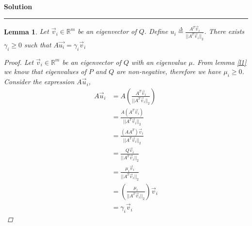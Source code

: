 \documentclass[a4paper,12pt]{article}
\newenvironment{solution}[2][]{%
    \begin{mdframed}[linecolor=blue!70!black, linewidth=2pt, roundcorner=10pt, backgroundcolor=yellow!10!white, skipabove=12pt, skipbelow=12pt]%
        \textbf{\large #2}
        \par\noindent\rule{\textwidth}{0.4pt}
}{
    \end{mdframed}
}
\newtheorem{lemma}{Lemma}
\begin{document}
\begin{solution}{Solution}
        \begin{lemma}\label{l3}
          Let $\vec{v}_{i} \in \mathbb{R}^{m}$ be an eigenvector of $Q$. Define 
          $u_{i} \stackrel{\Delta}{=} \frac{A^{T} \vec{v}_{i}}{\lvert\lvert A^{T} \vec{v}_{i} \rvert\rvert_{2}}$. There exists 
          $\gamma_{i} \geqslant 0$ such that $A\vec{u_{i}} = \gamma_{i} \vec{v}_{i}$
          \begin{proof} %
            Let $\vec{v}_{i} \in \mathbb{R}^{m}$ be an eigenvector of $Q$ with an eigenvalue $\mu$. From lemma \@\ref{l1} we know that eigenvalues of $P$ and $Q$ are non-negative, therefore we have 
            $\mu_{i} \geqslant 0$.
            Consider the expression $A\vec{u}_{i}$,
            \begin{align}
               A\vec{u}_{i} &= A \left(\frac{A^{T} \vec{v}_{i}}{\lvert\lvert A^{T} \vec{v}_{i} \rvert\rvert_{2}}\right) \nonumber \\
                            &= \frac{ A (A^{T} \vec{v}_{i})}{\lvert\lvert A^{T} \vec{v}_{i} \rvert\rvert_{2}} \nonumber \\
                            &= \frac{ (A A^{T}) \vec{v}_{i}}{\lvert\lvert A^{T} \vec{v}_{i} \rvert\rvert_{2}} \nonumber \\
                            &= \frac{Q\vec{v}_{i}}{\lvert\lvert A^{T} \vec{v}_{i} \rvert\rvert_{2}} \nonumber \\
                            &= \frac{\mu_{i}\vec{v}_{i}}{\lvert\lvert A^{T} \vec{v}_{i} \rvert\rvert_{2}} \nonumber \\
                            &= \left(\frac{\mu_{i}}{\lvert\lvert A^{T} \vec{v}_{i} \rvert\rvert_{2}}\right) \vec{v}_{i} \nonumber \\
                            &= \gamma_{i} \vec{v}_{i}
            \end{align}


\end{proof}
\end{lemma}
\end{solution}
\end{document}
